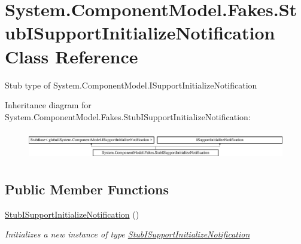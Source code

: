 \hypertarget{class_system_1_1_component_model_1_1_fakes_1_1_stub_i_support_initialize_notification}{\section{System.\-Component\-Model.\-Fakes.\-Stub\-I\-Support\-Initialize\-Notification Class Reference}
\label{class_system_1_1_component_model_1_1_fakes_1_1_stub_i_support_initialize_notification}
}


Stub type of System.\-Component\-Model.\-I\-Support\-Initialize\-Notification 


Inheritance diagram for System.\-Component\-Model.\-Fakes.\-Stub\-I\-Support\-Initialize\-Notification\-:\begin{figure}[H]
\begin{center}
\leavevmode
\includegraphics[height=1.284404cm]{class_system_1_1_component_model_1_1_fakes_1_1_stub_i_support_initialize_notification}
\end{center}
\end{figure}
\subsection*{Public Member Functions}
\begin{DoxyCompactItemize}
\item 
\hyperlink{class_system_1_1_component_model_1_1_fakes_1_1_stub_i_support_initialize_notification_a72ec7e314107f39e480ed63bca77ddd3}{Stub\-I\-Support\-Initialize\-Notification} ()
\begin{DoxyCompactList}\small\item\em Initializes a new instance of type \hyperlink{class_system_1_1_component_model_1_1_fakes_1_1_stub_i_support_initialize_notification}{Stub\-I\-Support\-Initialize\-Notification}\end{DoxyCompactList}\end{DoxyCompactItemize}
